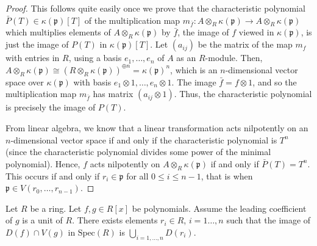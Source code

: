 \begin{proof}
This follows quite easily once we prove that the characteristic
polynomial $\bar P(T) \in \kappa(\mathfrak p)[T]$ of the
multiplication map $m_{\bar f}: A \otimes_R \kappa(\mathfrak p) \to
A \otimes_R \kappa(\mathfrak p)$ which multiplies elements of $A
\otimes_R \kappa(\mathfrak p)$ by $\bar f$, the image of $f$ viewed in
$\kappa(\mathfrak p)$, is just the image of $P(T)$ in
$\kappa(\mathfrak p)[T]$. Let $(a_{ij})$ be the matrix of the map
$m_f$ with entries in $R$, using a basis $e_1, \ldots, e_n$
of $A$ as an $R$-module.
Then, $A \otimes_R \kappa(\mathfrak p) \cong (R \otimes_R
\kappa(\mathfrak p))^{\oplus n} = \kappa(\mathfrak p)^n$, which is
an $n$-dimensional vector space over $\kappa(\mathfrak p)$ with
basis $e_1 \otimes 1,\ldots, e_n \otimes 1$. The image $\bar f = f
\otimes 1$, and so the multiplication map $m_{\bar f}$ has matrix
$(a_{ij} \otimes 1)$. Thus, the characteristic polynomial is
precisely the image of $P(T)$.

\medskip\noindent
From linear algebra, we know that a linear transformation acts
nilpotently on an $n$-dimensional vector space if and only if the
characteristic polynomial is $T^n$ (since the characteristic
polynomial divides some power of the minimal polynomial). Hence,
$f$ acts nilpotently on $A \otimes_R \kappa(\mathfrak p)$ if and
only if $\bar P(T) = T^n$. This occurs if and only if $r_i \in
\mathfrak p$ for all $0 \leq i \leq n - 1$, that is when $\mathfrak p \in
V(r_0,\ldots, r_{n - 1}).$
\end{proof}

\begin{lemma}
\label{lemma-affineline-special}
Let $R$ be a ring. Let $f, g \in R[x]$ be polynomials.
Assume the leading coefficient of $g$ is a unit of $R$.
There exists elements $r_i\in R$, $i=1\ldots,n$ such that
the image of $D(f) \cap V(g)$ in $\text{Spec}(R)$ is
$\bigcup_{i=1,\ldots,n} D(r_i)$.
\end{lemma}

